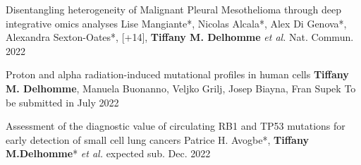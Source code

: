 \begin{cventries}
 
     \cvpublicationentry
    {} %
    {Disentangling heterogeneity of Malignant Pleural Mesothelioma through deep integrative omics analyses} %
    {Lise Mangiante*, Nicolas Alcala*, Alex Di Genova*, Alexandra Sexton-Oates*, [+14], \textbf{Tiffany M. Delhomme} \textit{et al.}} %
    {}
    {Nat. Commun. 2022} %
    {}     
    

    \cvpublicationentry
    {} %
     {Proton and alpha radiation-induced mutational profiles in human cells} %
    {\textbf{Tiffany M. Delhomme}, Manuela Buonanno, Veljko Grilj, Josep Biayna, Fran Supek} %
    {}
    {To be submitted in July 2022} %
    {}

    \cvpublicationentry
    {} %
    {Assessment of the diagnostic value of circulating RB1 and
TP53 mutations for early detection of small cell lung cancers} %
    {Patrice H. Avogbe*, \textbf{Tiffany M.Delhomme}* \textit{et al.}} %
    {}
    {expected sub. Dec. 2022} %
    {}
    
\end{cventries}
